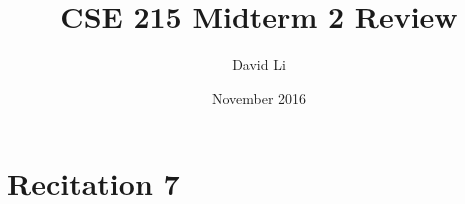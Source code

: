 \documentclass{article}
\title{CSE 215 Midterm 2 Review}
\author{David Li}
\date{November 2016}
\begin{document}
\maketitle

\section{Recitation 7}
\end{document}
